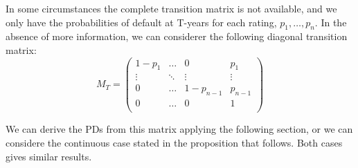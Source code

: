 \documentclass[11pt,fleqn]{book} %
\begin{document}
In some circumstances the complete transition matrix is not available, 
and we only have the probabilities of default at T-years for each rating, 
$p_1,\dots,p_n$. In the absence of more information, we can considerer 
the following diagonal transition matrix:
\begin{displaymath}
	M_T = \left(
	\begin{array}{cccc}
		1-p_1  & \dots  & 0         & p_1     \\
		\vdots & \ddots & \vdots    & \vdots  \\
		0      & \dots  & 1-p_{n-1} & p_{n-1} \\
		0      & \dots  & 0         & 1       \\
	\end{array}
	\right)
\end{displaymath}

We can derive the PDs from this matrix applying the following 
section, or we can considere the continuous case stated in the 
proposition that follows. Both cases gives similar results.
\end{document}
